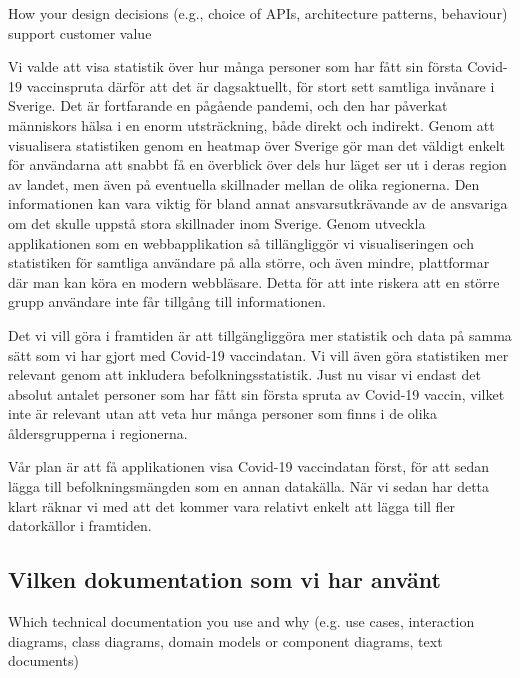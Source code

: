 \documentclass{scrartcl}
\begin{document}
\begin{displayquote}
    How your design decisions (e.g., choice of APIs, architecture patterns, behaviour) support customer value
\end{displayquote}

Vi valde att visa statistik över hur många personer som har fått sin första Covid-19 vaccinspruta därför att det är dagsaktuellt, för stort sett samtliga invånare i Sverige.
Det är fortfarande en pågående pandemi, och den har påverkat människors hälsa i en enorm utsträckning, både direkt och indirekt.
Genom att visualisera statistiken genom en heatmap över Sverige gör man det väldigt enkelt för användarna att snabbt få en överblick över dels hur läget ser ut i deras region av landet, men även på eventuella skillnader mellan de olika regionerna.
Den informationen kan vara viktig för bland annat ansvarsutkrävande av de ansvariga om det skulle uppstå stora skillnader inom Sverige.
Genom utveckla applikationen som en webbapplikation så tillängliggör vi visualiseringen och statistiken för samtliga användare på alla större, och även mindre, plattformar där man kan köra en modern webbläsare.
Detta för att inte riskera att en större grupp användare inte får tillgång till informationen.

Det vi vill göra i framtiden är att tillgängliggöra mer statistik och data på samma sätt som vi har gjort med Covid-19 vaccindatan.
Vi vill även göra statistiken mer relevant genom att inkludera befolkningsstatistik.
Just nu visar vi endast det absolut antalet personer som har fått sin första spruta av Covid-19 vaccin, vilket inte är relevant utan att veta hur många personer som finns i de olika åldersgrupperna i regionerna.

Vår plan är att få applikationen visa Covid-19 vaccindatan först, för att sedan lägga till befolkningsmängden som en annan datakälla.
När vi sedan har detta klart räknar vi med att det kommer vara relativt enkelt att lägga till fler datorkällor i framtiden.

\subsection{Vilken dokumentation som vi har använt}

\begin{displayquote}
    Which technical documentation you use and why (e.g. use cases, interaction diagrams, class diagrams, domain models or component diagrams, text documents)
\end{displayquote}
\end{document}
